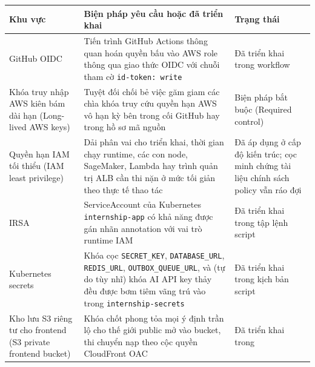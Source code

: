 {
\begingroup
\small
\setlength{\tabcolsep}{3pt}
\renewcommand{\arraystretch}{1.15}
\begin{longtable}{@{}
  >{\raggedright\arraybackslash}p{}
  >{\raggedright\arraybackslash}p{}
  >{\raggedright\arraybackslash}p{}@{}}
\toprule\noalign{}
\begin{minipage}[b]{\linewidth}\raggedright
Khu vực
\end{minipage} & \begin{minipage}[b]{\linewidth}\raggedright
Biện pháp yêu cầu hoặc đã triển khai
\end{minipage} & \begin{minipage}[b]{\linewidth}\raggedright
Trạng thái
\end{minipage} \\
\midrule\noalign{}
\endhead
\bottomrule\noalign{}
\endlastfoot
GitHub OIDC & Tiến trình GitHub Actions thông quan hoán quyền bấu vào
AWS role thông qua giao thức OIDC với chuỗi tham cờ
\texttt{id-\allowbreak{}token:\ write} & Đã triển khai trong workflow \\
Khóa truy nhập AWS kiên bám dài hạn (Long-lived AWS keys) & Tuyệt đối
chối bẻ việc găm giam các chìa khóa truy cứu quyền hạn AWS vô hạn kỳ bên
trong cối GitHub hay trong hồ sơ mã nguồn & Biện pháp bắt buộc (Required
control) \\
Quyền hạn IAM tối thiểu (IAM least privilege) & Dải phân vai cho triển
khai, thời gian chạy runtime, các con node, SageMaker, Lambda hay trình
quản trị ALB cần thi nặn ở mức tối giản theo thực tế thao tác & Đã áp
dụng ở cấp độ kiến trúc; cọc minh chứng tài liệu chính sách policy vẫn
ráo đợi \\
IRSA & ServiceAccount của Kubernetes \texttt{internship-\allowbreak{}app} có khả năng
được gán nhãn annotation với vai trò runtime IAM & Đã triển khai trong
tập lệnh script \\
Kubernetes secrets & Khóa cọc \texttt{SECRET\_\allowbreak{}KEY},
\texttt{DATABASE\_\allowbreak{}URL}, \texttt{REDIS\_\allowbreak{}URL},
\texttt{OUTBOX\_\allowbreak{}QUEUE\_\allowbreak{}URL}, và (tự do tùy nhĩ) khóa AI API key thảy đều
được bơm tiêm vãng trú vào trong \texttt{internship-\allowbreak{}secrets} & Đã triển
khai trong kịch bản script \\
Kho lưu S3 riêng tư cho frontend (S3 private frontend bucket) & Khóa
chốt phong tỏa mọi ý định trần lộ cho thế giới public mở vào bucket, thi
chuyển nạp theo cộc quyền CloudFront OAC & Đã triển khai trong

\end{longtable}}

